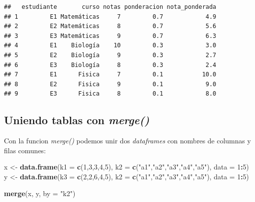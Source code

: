 \documentclass[
]{book}
\newenvironment{Shaded}{\begin{snugshade}}{\end{snugshade}}
\newcommand{\AttributeTok}[1]{\textcolor[rgb]{0.13,0.29,0.53}{#1}}
\newcommand{\DecValTok}[1]{\textcolor[rgb]{0.00,0.00,0.81}{#1}}
\newcommand{\FunctionTok}[1]{\textcolor[rgb]{0.13,0.29,0.53}{\textbf{#1}}}
\newcommand{\NormalTok}[1]{#1}
\newcommand{\OtherTok}[1]{\textcolor[rgb]{0.56,0.35,0.01}{#1}}
\newcommand{\SpecialCharTok}[1]{\textcolor[rgb]{0.81,0.36,0.00}{\textbf{#1}}}
\newcommand{\StringTok}[1]{\textcolor[rgb]{0.31,0.60,0.02}{#1}}
\begin{document}
\begin{verbatim}
##   estudiante       curso notas ponderacion nota_ponderada
## 1         E1 Matemáticas     7         0.7            4.9
## 2         E2 Matemáticas     8         0.7            5.6
## 3         E3 Matemáticas     9         0.7            6.3
## 4         E1    Biología    10         0.3            3.0
## 5         E2    Biología     9         0.3            2.7
## 6         E3    Biología     8         0.3            2.4
## 7         E1      Fisica     7         0.1           10.0
## 8         E2      Fisica     9         0.1            9.0
## 9         E3      Fisica     8         0.1            8.0
\end{verbatim}

\hfill\break

\subsection{\texorpdfstring{Uniendo tablas con \emph{merge()}}{Uniendo tablas con merge()}}\label{uniendo-tablas-con-merge}

Con la funcion \emph{merge()} podemos unir dos \emph{dataframes} con nombres de columnas y filas comunes:

\begin{Shaded}
\begin{Highlighting}[]
\NormalTok{x }\OtherTok{\textless{}{-}} \FunctionTok{data.frame}\NormalTok{(}\AttributeTok{k1 =} \FunctionTok{c}\NormalTok{(}\DecValTok{1}\NormalTok{,}\DecValTok{3}\NormalTok{,}\DecValTok{3}\NormalTok{,}\DecValTok{4}\NormalTok{,}\DecValTok{5}\NormalTok{), }\AttributeTok{k2 =} \FunctionTok{c}\NormalTok{(}\StringTok{"a1"}\NormalTok{,}\StringTok{"a2"}\NormalTok{,}\StringTok{"a3"}\NormalTok{,}\StringTok{"a4"}\NormalTok{,}\StringTok{"a5"}\NormalTok{), }\AttributeTok{data =} \DecValTok{1}\SpecialCharTok{:}\DecValTok{5}\NormalTok{)}
\NormalTok{y }\OtherTok{\textless{}{-}} \FunctionTok{data.frame}\NormalTok{(}\AttributeTok{k3 =} \FunctionTok{c}\NormalTok{(}\DecValTok{2}\NormalTok{,}\DecValTok{2}\NormalTok{,}\DecValTok{6}\NormalTok{,}\DecValTok{4}\NormalTok{,}\DecValTok{5}\NormalTok{), }\AttributeTok{k2 =} \FunctionTok{c}\NormalTok{(}\StringTok{"a1"}\NormalTok{,}\StringTok{"a2"}\NormalTok{,}\StringTok{"a3"}\NormalTok{,}\StringTok{"a4"}\NormalTok{,}\StringTok{"a5"}\NormalTok{), }\AttributeTok{data =} \DecValTok{1}\SpecialCharTok{:}\DecValTok{5}\NormalTok{)}

\FunctionTok{merge}\NormalTok{(x, y, }\AttributeTok{by =} \StringTok{"k2"}\NormalTok{) }
\end{Highlighting}
\end{Shaded}
\end{document}
